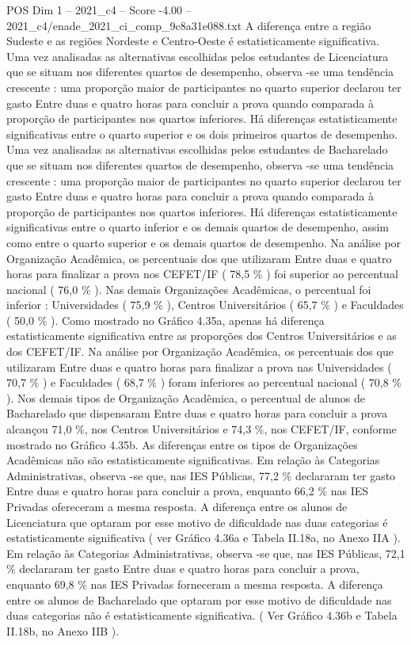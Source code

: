 \begin{textsample}{POS Dim 1 – 2021\_c4 – Score -4.00 – 2021\_c4/enade\_2021\_ci\_comp\_9c8a31e088.txt}
A diferença entre a região Sudeste e as regiões Nordeste e Centro-Oeste é estatisticamente significativa.
Uma vez analisadas as alternativas escolhidas pelos estudantes de Licenciatura que se situam nos diferentes quartos de desempenho, observa -se uma tendência crescente : uma proporção maior de participantes no quarto superior declarou ter gasto Entre duas e quatro horas para concluir a prova quando comparada à proporção de participantes nos quartos inferiores.
Há diferenças estatisticamente significativas entre o quarto superior e os dois primeiros quartos de desempenho.
Uma vez analisadas as alternativas escolhidas pelos estudantes de Bacharelado que se situam nos diferentes quartos de desempenho, observa -se uma tendência crescente : uma proporção maior de participantes no quarto superior declarou ter gasto Entre duas e quatro horas para concluir a prova quando comparada à proporção de participantes nos quartos inferiores.
Há diferenças estatisticamente significativas entre o quarto inferior e os demais quartos de desempenho, assim como entre o quarto superior e os demais quartos de desempenho.
Na análise por Organização Acadêmica, os percentuais dos que utilizaram Entre duas e quatro horas para finalizar a prova nos CEFET/IF ( 78,5 \% ) foi superior ao percentual nacional ( 76,0 \% ).
Nas demais Organizações Acadêmicas, o percentual foi inferior : Universidades ( 75,9 \% ), Centros Universitários ( 65,7 \% ) e Faculdades ( 50,0 \% ).
Como mostrado no Gráfico 4.35a, apenas há diferença estatisticamente significativa entre as proporções dos Centros Universitários e as dos CEFET/IF.
Na análise por Organização Acadêmica, os percentuais dos que utilizaram Entre duas e quatro horas para finalizar a prova nas Universidades ( 70,7 \% ) e Faculdades ( 68,7 \% ) foram inferiores ao percentual nacional ( 70,8 \% ).
Nos demais tipos de Organização Acadêmica, o percentual de alunos de Bacharelado que dispensaram Entre duas e quatro horas para concluir a prova alcançou 71,0 \%, nos Centros Universitários e 74,3 \%, nos CEFET/IF, conforme mostrado no Gráfico 4.35b.
As diferenças entre os tipos de Organizações Acadêmicas não são estatisticamente significativas.
Em relação às Categorias Administrativas, observa -se que, nas IES Públicas, 77,2 \% declararam ter gasto Entre duas e quatro horas para concluir a prova, enquanto 66,2 \% nas IES Privadas ofereceram a mesma resposta.
A diferença entre os alunos de Licenciatura que optaram por esse motivo de dificuldade nas duas categorias é estatisticamente significativa ( ver Gráfico 4.36a e Tabela II.18a, no Anexo IIA ).
Em relação às Categorias Administrativas, observa -se que, nas IES Públicas, 72,1 \% declararam ter gasto Entre duas e quatro horas para concluir a prova, enquanto 69,8 \% nas IES Privadas forneceram a mesma resposta.
A diferença entre os alunos de Bacharelado que optaram por esse motivo de dificuldade nas duas categorias não é estatisticamente significativa. ( Ver Gráfico 4.36b e Tabela II.18b, no Anexo IIB ).

\end{textsample}

